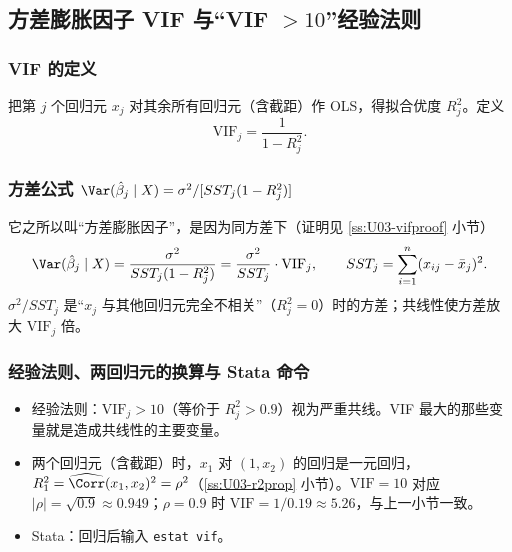 \subsection{方差膨胀因子 VIF 与“VIF \texorpdfstring{$>10$}{> 10}”经验法则}

\subsubsection{VIF 的定义}

\begin{defn}[方差膨胀因子]\label{def:U03-vif}
把第 $j$ 个回归元 $x_j$ 对其余所有回归元（含截距）作 OLS，得拟合优度 $R_j^2$。定义
\[
\mathrm{VIF}_j=\frac1{1-R_j^2}.
\]
\end{defn}

\subsubsection{方差公式 \texorpdfstring{$\Var(\hat\beta_j\mid X)=\sigma^2/[SST_j(1-R_j^2)]$}{Var(beta\_j|X) = sigma\^{}2/[SST\_j(1-R\_j\^{}2)]}}

它之所以叫“方差膨胀因子”，是因为同方差下（证明见 \ref{ss:U03-vifproof} 小节）
\begin{equation}\label{eq:U03-vif}
\Var(\hat\beta_j\mid X)=\frac{\sigma^2}{SST_j(1-R_j^2)}=\frac{\sigma^2}{SST_j}\cdot\mathrm{VIF}_j,\qquad SST_j=\sum_{i=1}^n(x_{ij}-\bar x_j)^2 .
\end{equation}
$\sigma^2/SST_j$ 是“$x_j$ 与其他回归元完全不相关”（$R_j^2=0$）时的方差；共线性使方差放大 $\mathrm{VIF}_j$ 倍。

\subsubsection{经验法则、两回归元的换算与 Stata 命令}

\begin{itemize}
  \item 经验法则：$\mathrm{VIF}_j>10$（等价于 $R_j^2>0.9$）视为严重共线。VIF 最大的那些变量就是造成共线性的主要变量。
  \item 两个回归元（含截距）时，$x_1$ 对 $(1,x_2)$ 的回归是一元回归，$R_1^2=\widehat{\Corr}(x_1,x_2)^2=\rho^2$（\ref{ss:U03-r2prop} 小节）。$\mathrm{VIF}=10$ 对应 $|\rho|=\sqrt{0.9}\approx0.949$；$\rho=0.9$ 时 $\mathrm{VIF}=1/0.19\approx5.26$，与上一小节一致。
  \item Stata：回归后输入 \texttt{estat vif}。
\end{itemize}

